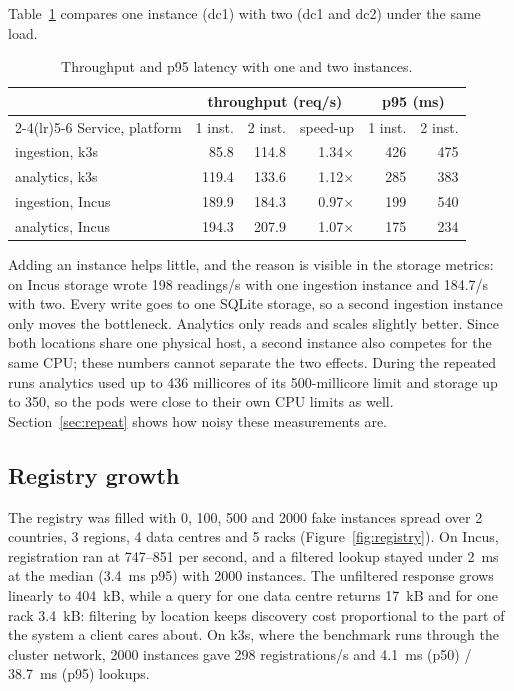 Table~\ref{tab:scale} compares one instance (dc1) with two (dc1 and dc2) under the same load.

\begin{table}[ht]
\centering\small
\caption{Throughput and p95 latency with one and two instances.}
\label{tab:scale}
\begin{tabular}{@{}l rrr rr@{}}
\toprule
 & \multicolumn{3}{c}{throughput (req/s)} & \multicolumn{2}{c}{p95 (ms)} \\
\cmidrule(lr){2-4}\cmidrule(lr){5-6}
Service, platform & 1 inst. & 2 inst. & speed-up & 1 inst. & 2 inst. \\
\midrule
ingestion, k3s   & 85.8  & 114.8 & 1.34$\times$ & 426 & 475 \\
analytics, k3s   & 119.4 & 133.6 & 1.12$\times$ & 285 & 383 \\
ingestion, Incus & 189.9 & 184.3 & 0.97$\times$ & 199 & 540 \\
analytics, Incus & 194.3 & 207.9 & 1.07$\times$ & 175 & 234 \\
\bottomrule
\end{tabular}
\end{table}

Adding an instance helps little, and the reason is visible in the storage metrics: on Incus storage
wrote 198 readings/s with one ingestion instance and 184.7/s with two. Every write goes to one
SQLite storage, so a second ingestion instance only moves the bottleneck. Analytics only reads and
scales slightly better. Since both locations share one physical host, a second instance also
competes for the same CPU; these numbers cannot separate the two effects. During the repeated
runs analytics used up to 436 millicores of its 500-millicore limit and storage up to 350, so the
pods were close to their own CPU limits as well. Section~\ref{sec:repeat} shows how noisy these
measurements are.

\subsection{Registry growth}

The registry was filled with 0, 100, 500 and 2000 fake instances spread over 2 countries,
3 regions, 4 data centres and 5 racks (Figure~\ref{fig:registry}). On Incus, registration ran at
747--851 per second, and a filtered lookup stayed under 2~ms at the median (3.4~ms p95) with 2000
instances. The unfiltered  response grows linearly to 404~kB, while a query for one
data centre returns 17~kB and for one rack 3.4~kB: filtering by location keeps discovery cost
proportional to the part of the system a client cares about. On k3s, where the benchmark runs
through the cluster network, 2000 instances gave 298 registrations/s and 4.1~ms (p50) / 38.7~ms
(p95) lookups.


